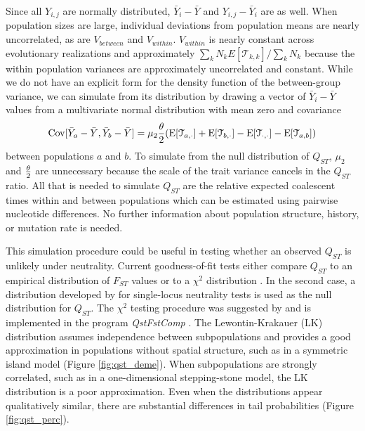 Since all $Y_{i,j}$ are normally distributed, $\bar{Y}_{i} - \bar{Y}$ and
$Y_{i,j} - \bar{Y}_i$ are as well. When population sizes are large, individual
deviations from population means are nearly uncorrelated, as are $V_{between}$
and $V_{within}$. $V_{within}$ is nearly constant across evolutionary
realizations and approximately $\sum_k N_k E[\mathcal{T}_{k,k}] / \sum_k N_k$
because the within population variances are approximately uncorrelated and
constant. While we do not have an explicit form for the density function of the
between-group variance, we can simulate from its distribution by drawing a
vector of $\bar{Y}_{i} - \bar{Y}$ values from a multivariate normal distribution
with mean zero and covariance
\begin{equation}
  \mathrm{Cov}[\bar{Y}_{a} - \bar{Y}, \bar{Y}_{b} - \bar{Y}] =
  \mu_2 \frac{\theta}{2} (\mathrm{E}[\mathcal{T}_{a,\cdot}] + \mathrm{E}[\mathcal{T}_{b,\cdot}] -
  \mathrm{E}[\mathcal{T}_{\cdot,\cdot}] - \mathrm{E}[\mathcal{T}_{a,b}])
\end{equation}
between populations $a$ and $b$. To simulate from the null distribution of
$Q_{ST}$, $\mu_2$ and $\frac{\theta}{2}$ are unnecessary because the scale of the trait
variance cancels in the $Q_{ST}$ ratio. All that is needed to simulate $Q_{ST}$
are the relative expected coalescent times within and between populations which
can be estimated using pairwise nucleotide differences. No further information
about population structure, history, or mutation rate is needed.

This simulation procedure could be useful in testing whether an observed
$Q_{ST}$ is unlikely under neutrality. Current goodness-of-fit tests either
compare $Q_{ST}$ to an empirical distribution of $F_{ST}$ values or to a
$\chi^2$ distribution \citep{Leinonen2013}. In the second case, a distribution
developed by \citet{Lewontin1973} for single-locus neutrality tests is used as
the null distribution for $Q_{ST}$. The $\chi^2$ testing procedure was suggested
by \citet{Whitlock2009} and is implemented in the program \textit{QstFstComp}
\citep{Gilbert2015}. The Lewontin-Krakauer (LK) distribution assumes
independence between subpopulations and provides a good approximation in
populations without spatial structure, such as in a symmetric island model
(Figure \ref{fig:qst_deme}). When subpopulations are strongly correlated, such
as in a one-dimensional stepping-stone model, the LK distribution is a poor
approximation. Even when the distributions appear qualitatively similar, there
are substantial differences in tail probabilities (Figure \ref{fig:qst_perc}).

